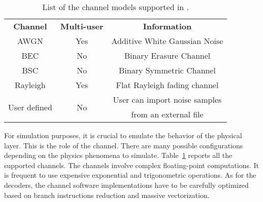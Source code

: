 \begin{table}[htp]
  \centering
  \caption{List of the channel models supported in \AFFECT.}
  \label{tab:aff3ct_features_channels}
  \begin{tabular}{ c | c | c }
  \multirow{2}{*}{\textbf{Channel}}      & \multirow{2}{*}{\textbf{Multi-user}} & \multirow{2}{*}{\textbf{Information}}          \\
                                         &                                      &                                                \\
  \hline
  \hline
  \multirow{2}{*}{{AWGN}}                & \multirow{2}{*}{Yes}                 & \multirow{2}{*}{Additive White Gaussian Noise} \\
                                         &                                      &                                                \\
  \hline
  \multirow{2}{*}{{BEC}}                 & \multirow{2}{*}{No}                  & \multirow{2}{*}{Binary Erasure Channel}        \\
                                         &                                      &                                                \\
  \hline
  \multirow{2}{*}{{BSC}}                 & \multirow{2}{*}{No}                  & \multirow{2}{*}{Binary Symmetric Channel}      \\
                                         &                                      &                                                \\
  \hline
  \multirow{2}{*}{{Rayleigh}}            & \multirow{2}{*}{Yes}                 & \multirow{2}{*}{Flat Rayleigh fading channel}  \\
                                         &                                      &                                                \\
  \hline
  \multirow{2}{*}{{User defined}}        & \multirow{2}{*}{No}                  & User can import noise samples                  \\
                                         &                                      & from an external file                          \\
  \end{tabular}
\end{table}

For simulation purposes, it is crucial to emulate the behavior of the physical
layer. This is the role of the channel. There are many possible configurations
depending on the physics phenomena to simulate.
Table~\ref{tab:aff3ct_features_channels} reports all the supported channels. The
channels involve complex floating-point computations. It is frequent to use
expensive exponential and trigonometric operations. As for the decoders, the
channel software implementations have to be carefully optimized based on branch
instructions reduction and massive vectorization.

